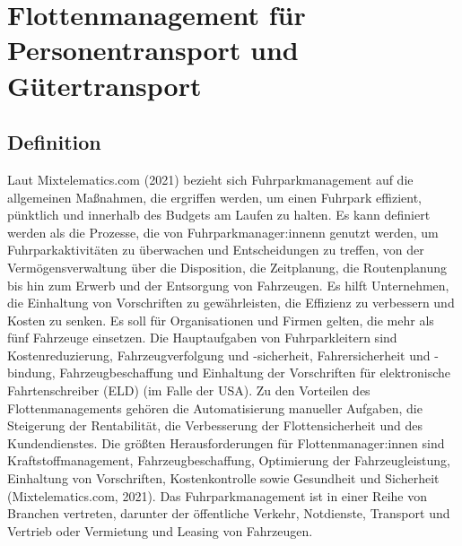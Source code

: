 \documentclass[
]{book}
\begin{document}
\hypertarget{p_g_fleet_management}{%
\section{Flottenmanagement für Personentransport und Gütertransport}\label{p_g_fleet_management}}

\hypertarget{definition-16}{%
\subsection*{Definition}\label{definition-16}}

Laut Mixtelematics.com (2021) bezieht sich Fuhrparkmanagement auf die allgemeinen Maßnahmen, die ergriffen werden, um einen Fuhrpark effizient, pünktlich und innerhalb des Budgets am Laufen zu halten. Es kann definiert werden als die Prozesse, die von Fuhrparkmanager:innenn genutzt werden, um Fuhrparkaktivitäten zu überwachen und Entscheidungen zu treffen, von der Vermögensverwaltung über die Disposition, die Zeitplanung, die Routenplanung bis hin zum Erwerb und der Entsorgung von Fahrzeugen. Es hilft Unternehmen, die Einhaltung von Vorschriften zu gewährleisten, die Effizienz zu verbessern und Kosten zu senken. Es soll für Organisationen und Firmen gelten, die mehr als fünf Fahrzeuge einsetzen. Die Hauptaufgaben von Fuhrparkleitern sind Kostenreduzierung, Fahrzeugverfolgung und -sicherheit, Fahrersicherheit und -bindung, Fahrzeugbeschaffung und Einhaltung der Vorschriften für elektronische Fahrtenschreiber (ELD) (im Falle der USA). Zu den Vorteilen des Flottenmanagements gehören die Automatisierung manueller Aufgaben, die Steigerung der Rentabilität, die Verbesserung der Flottensicherheit und des Kundendienstes. Die größten Herausforderungen für Flottenmanager:innen sind Kraftstoffmanagement, Fahrzeugbeschaffung, Optimierung der Fahrzeugleistung, Einhaltung von Vorschriften, Kostenkontrolle sowie Gesundheit und Sicherheit (Mixtelematics.com, 2021).
Das Fuhrparkmanagement ist in einer Reihe von Branchen vertreten, darunter der öffentliche Verkehr, Notdienste, Transport und Vertrieb oder Vermietung und Leasing von Fahrzeugen.
\end{document}
